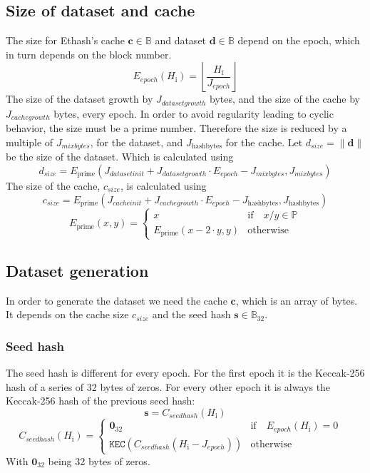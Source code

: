 \documentclass[9pt,oneside]{amsart}
\makeatletter
\newcommand{\linkdest}[1]{\Hy@raisedlink{\hypertarget{#1}{}}}
\makeatother
\begin{document}
\subsection{Size of dataset and cache}
The size for Ethash's cache $\mathbf{c} \in \mathbb{B}$  and dataset $\mathbf{d} \in \mathbb{B}$ depend on the epoch, which in turn depends on the block number.
\begin{equation}
 E_{epoch}(H_{\mathrm{i}}) = \left\lfloor\frac{H_{\mathrm{i}}}{J_{epoch}}\right\rfloor
\end{equation}
The size of the dataset growth by $J_{datasetgrowth}$ bytes, and the size of the cache by $J_{cachegrowth}$ bytes, every epoch. In order to avoid regularity leading to cyclic behavior, the size must be a prime number. Therefore the size is reduced by a multiple of $J_{mixbytes}$, for the dataset, and $J_{\mathrm{hashbytes}}$ for the cache.
\linkdest{d__size}{}Let $d_{size} = \lVert \mathbf{d} \rVert$ be the size of the dataset. Which is calculated using
\begin{equation}
 d_{size} = E_{\mathrm{prime}}(J_{datasetinit} + J_{datasetgrowth} \cdot E_{epoch} - J_{mixbytes}, J_{mixbytes})
\end{equation}
The size of the cache, $c_{size}$, is calculated using
\begin{equation}
 c_{size} = E_{\mathrm{prime}}(J_{cacheinit} + J_{cachegrowth} \cdot E_{epoch} - J_{\mathrm{hashbytes}}, J_{\mathrm{hashbytes}})
\end{equation}
\begin{equation}
 E_{\mathrm{prime}}(x, y) = \begin{cases}
x & \text{if} \quad x / y \in \mathbb{P} \\
E_{\mathrm{prime}}(x - 2 \cdot y, y) & \text{otherwise}
\end{cases}
\end{equation}
\subsection{Dataset generation}
In order to generate the dataset we need the cache $\mathbf{c}$, which is an array of bytes. It depends on the cache size  $c_{size}$ and the seed hash $\mathbf{s} \in \mathbb{B}_{32}$.
\subsubsection{Seed hash}
The seed hash is different for every epoch. For the first epoch it is the Keccak-256 hash of a series of 32 bytes of zeros. For every other epoch it is always the Keccak-256 hash of the previous seed hash:
\begin{equation}
 \mathbf{s} = C_{seedhash}(H_{\mathrm{i}})
\end{equation}
\begin{equation}
 C_{seedhash}(H_{\mathrm{i}}) = \begin{cases}
\mathbf{0}_{32} & \text{if} \quad E_{epoch}(H_{\mathrm{i}}) = 0 \quad  \\
\texttt{KEC}(C_{seedhash}(H_{\mathrm{i}} - J_{epoch})) & \text{otherwise}
\end{cases}
\end{equation}
With $\mathbf{0}_{32}$ being 32 bytes of zeros.
\end{document}
